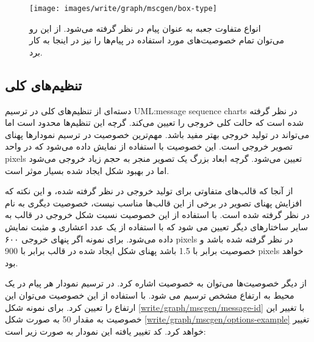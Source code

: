 \begin{figure}
\centering
\texttt{[image: images/write/graph/mscgen/box-type]}
\caption[خصوصیت‌های متفاوت جعبه‌ها]{
	انواع متفاوت جعبه به عنوان پیام در نظر گرفته می‌شود. از این رو می‌توان تمام
	خصوصیت‌های مورد استفاده در پیام‌ها را نیز در اینجا به کار برد.
	}
\label{write/graph/mscgen/box-type}
\end{figure}

\subsection{تنظیم‌های کلی}

دسته‌ای از تنظیم‌های کلی در ترسیم \glspl{UML:message sequence chart} در نظر
گرفته شده است که حالت کلی خروجی را تعیین می‌کند. گرچه این تنظیم‌ها محدود است اما
می‌تواند در تولید خروجی بهتر مفید باشد. مهم‌ترین خصوصیت در ترسیم نمودارها پهنای
تصویر خروجی است. این خصوصیت با استفاده از  نمایش داده می‌شود که در
واحد \glspl{pixel} تعیین می‌شود. گرچه ابعاد بزرگ یک تصویر منجر به حجم زیاد خروجی
می‌شود اما در بهبود شکل ایجاد شده بسیار موثر است.

از آنجا که قالب‌های متفاوتی برای تولید خروجی در نظر گرفته شده، و این نکته که
افزایش پهنای تصویر در برخی از این قالب‌ها مناسب نیست، خصوصیت دیگری به نام
 در نظر گرفته شده است. با استفاده از این خصوصیت نسبت شکل خروجی در
قالب  به سایر ساختارهای دیگر تعیین می شود که با استفاده از یک عدد اعشاری
و مثبت نمایش داده می‌شود. برای نمونه اگر پنهای خروجی ۶۰۰ \glspl{pixel} در نظر
گرفته شده باشد و خصوصیت  برابر با 1.5 باشد پهنای شکل ایجاد شده در
قالب  برابر با 900 \glspl{pixel} خواهد بود.

از دیگر خصوصیت‌ها می‌توان به خصوصیت  اشاره کرد. در ترسیم نمودار
هر پیام در یک محیط به ارتفاع مشخص ترسیم می شود. با استفاده از این خصوصیت می‌توان
این ارتفاع را تعیین کرد. برای نمونه شکل \ref{write/graph/mscgen/message-id} با
تغییر این خصوصیت به مقدار 50 به صورت شکل
\ref{write/graph/mscgen/options-example} تغییر خواهد کرد. کد تغییر یافته این
نمودار به صورت زیر است:


